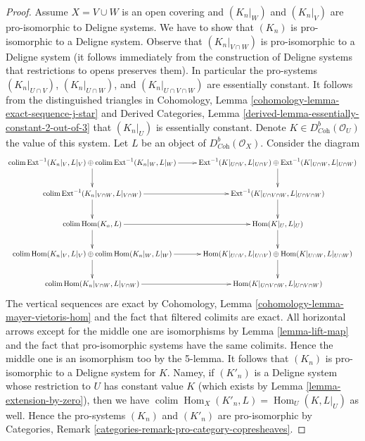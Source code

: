 \documentclass[10pt,a4paper]{amsart}
\theoremstyle{plain}
\theoremstyle{definition}
\theoremstyle{remark}
\numberwithin{equation}{subsection}
\def\colim{\mathop{\mathrm{colim}}\nolimits}
\def\Hom{\mathop{\mathrm{Hom}}\nolimits}
\def\Ext{\mathop{\mathrm{Ext}}\nolimits}
\begin{document}
\begin{proof}
\medskip\noindent
Assume $X = V \cup W$ is an open covering and
$(K_n|_W)$ and $(K_n|_V)$ are pro-isomorphic to Deligne systems.
We have to show that $(K_n)$ is pro-isomorphic to a Deligne system.
Observe that $(K_n|_{V \cap W})$ is pro-isomorphic to a Deligne system
(it follows immediately from the construction of Deligne systems
that restrictions to opens preserves them). In particular the pro-systems
$(K_n|_{U \cap V})$,
$(K_n|_{U \cap W})$, and
$(K_n|_{U \cap V \cap W})$
are essentially constant. It follows from the distinguished triangles
in Cohomology, Lemma \ref{cohomology-lemma-exact-sequence-j-star} and
Derived Categories, Lemma \ref{derived-lemma-essentially-constant-2-out-of-3}
that $(K_n|_U)$ is essentially constant.
Denote $K \in D^b_{\textit{Coh}}(\mathcal{O}_U)$ the value of this system.
Let $L$ be an object of $D^b_{\textit{Coh}}(\mathcal{O}_X)$.
Consider the diagram
$$
\xymatrix{
\colim \Ext^{-1}(K_n|_V, L|_V) \oplus
\colim \Ext^{-1}(K_n|_W, L|_W) \ar[r] \ar[d] &
\Ext^{-1}(K|_{U \cap V}, L|_{U \cap V}) \oplus
\Ext^{-1}(K|_{U \cap W}, L|_{U \cap W}) \ar[d] \\
\colim \Ext^{-1}(K_n|_{V \cap W}, L|_{V \cap W}) \ar[r] \ar[d] &
\Ext^{-1}(K|_{U \cap V \cap W}, L|_{U \cap V \cap W}) \ar[d] \\
\colim \Hom(K_n, L) \ar[d] \ar[r] &
\Hom(K|_U, L|_U) \ar[d] \\
\colim \Hom(K_n|_V, L|_V) \oplus \colim \Hom(K_n|_W, L|_W) \ar[r] \ar[d] &
\Hom(K|_{U \cap V}, L|_{U \cap V}) \oplus
\Hom(K|_{U \cap W}, L|_{U \cap W}) \ar[d] \\
\colim \Hom(K_n|_{V \cap W}, L|_{V \cap W}) \ar[r] &
\Hom(K|_{U \cap V \cap W}, L|_{U \cap V \cap W})
}
$$
The vertical sequences are exact by
Cohomology, Lemma \ref{cohomology-lemma-mayer-vietoris-hom}
and the fact that filtered colimits are exact.
All horizontal arrows except for the middle one are isomorphisms
by Lemma \ref{lemma-lift-map} and the fact that pro-isomorphic systems
have the same colimits. Hence the middle one is an isomorphism too by
the 5-lemma. It follows that $(K_n)$ is pro-isomorphic to
a Deligne system for $K$. Namey, if $(K'_n)$ is a Deligne system
whose restriction to $U$ has constant value $K$ (which
exists by Lemma \ref{lemma-extension-by-zero}), then
we have $\colim \Hom_X(K'_n, L) = \Hom_U(K, L|_U)$ as well.
Hence the pro-systems $(K_n)$ and $(K'_n)$ are
pro-isomorphic by
Categories, Remark \ref{categories-remark-pro-category-copresheaves}.
\end{proof}
\end{document}
